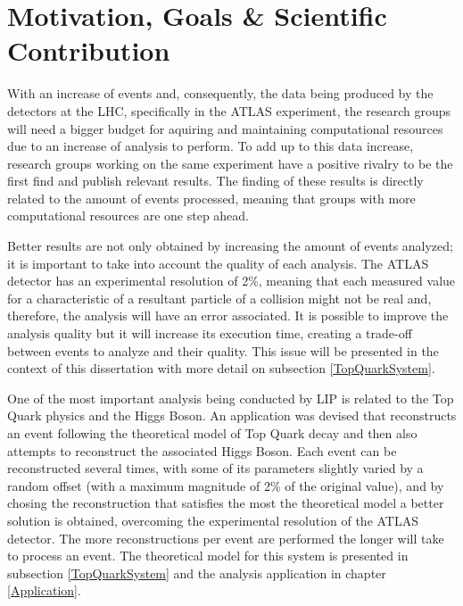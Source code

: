 
\section{Motivation, Goals \& Scientific Contribution}
\label{Motivation}

With an increase of events and, consequently, the data being produced by the detectors at the LHC, specifically in the ATLAS experiment, the research groups will need a bigger budget for aquiring and maintaining computational resources due to an increase of analysis to perform. To add up to this data increase, research groups working on the same experiment have a positive rivalry to be the first find and publish relevant results. The finding of these results is directly related to the amount of events processed, meaning that groups with more computational resources are one step ahead.

Better results are not only obtained by increasing the amount of events analyzed; it is important to take into account the quality of each analysis. The ATLAS detector has an experimental resolution of 2\%, meaning that each measured value for a characteristic of a resultant particle of a collision might not be real and, therefore, the analysis will have an error associated. It is possible to improve the analysis quality but it will increase its execution time, creating a trade-off between events to analyze and their quality. This issue will be presented in the context of this dissertation with more detail on subsection \ref{TopQuarkSystem}.

One of the most important analysis being conducted by LIP is related to the Top Quark physics and the Higgs Boson. An application was devised that reconstructs an event following the theoretical model of Top Quark decay and then also attempts to reconstruct the associated Higgs Boson. Each event can be reconstructed several times, with some of its parameters slightly varied by a random offset (with a maximum magnitude of 2\% of the original value), and by chosing the reconstruction that satisfies the most the theoretical model a better solution is obtained, overcoming the experimental resolution of the ATLAS detector. The more reconstructions per event are performed the longer will take to process an event. The theoretical model for this system is presented in subsection \ref{TopQuarkSystem} and the analysis application in chapter \ref{Application}.

